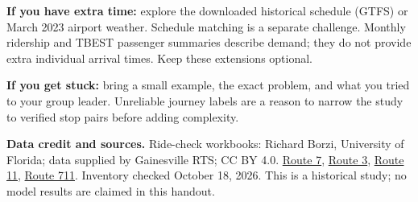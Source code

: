 \documentclass[11pt,letterpaper]{article}
\begin{document}
\textbf{If you have extra time:} explore the downloaded historical schedule
(GTFS) or March 2023 airport weather. Schedule matching is a separate challenge.
Monthly ridership and TBEST passenger summaries describe demand; they do not
provide extra individual arrival times. Keep these extensions optional.

\textbf{If you get stuck:} bring a small example, the exact problem, and what
you tried to your group leader. Unreliable journey labels are a reason to
narrow the study to verified stop pairs before adding complexity.

\vfill
{\footnotesize\textbf{Data credit and sources.} Ride-check workbooks: Richard Borzi,
University of Florida; data supplied by Gainesville RTS; CC BY 4.0.
\href{https://zenodo.org/records/10034933}{Route 7},
\href{https://zenodo.org/records/10034688}{Route 3},
\href{https://zenodo.org/records/10034723}{Route 11},
\href{https://zenodo.org/records/10034622}{Route 711}.
Inventory checked October 18, 2026. This is a historical study; no model
results are claimed in this handout.}
\end{document}
